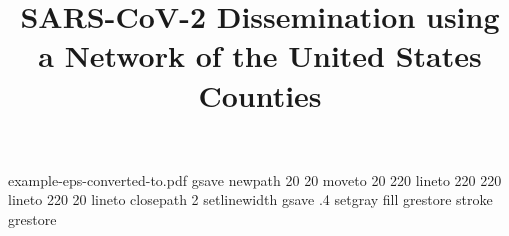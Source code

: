 %
%
%
%
%
\begin{filecontents*}{example-eps-converted-to.pdf}
gsave
newpath
  20 20 moveto
  20 220 lineto
  220 220 lineto
  220 20 lineto
closepath
2 setlinewidth
gsave
  .4 setgray fill
grestore
stroke
grestore
\end{filecontents*}
%
\RequirePackage{fix-cm,amssymb}
%
\documentclass[smallextended]{svjour3}       %
%
\smartqed  %
%


\newcommand{\RP}{\mathbb{RP}}
\newcommand{\Z}{\mathbb{Z}}
\newcommand{\R}{\mathbb{R}}
\newcommand{\QQ}{\mathbb{Q}}
\newcommand{\PP}{\mathbb{P}}
\newcommand{\CC}{\mathbb{C}}
\newcommand{\TP}{\mathbb{TP}}
 \def\red#1{{{#1}}}
\usepackage{graphicx}
\usepackage{url}
\usepackage{comment}
\usepackage{caption}
\usepackage{subcaption}
\captionsetup{compatibility=false}
%
%
%
%
%


\title{SARS-CoV-2 Dissemination using a Network of the United States Counties%
}

